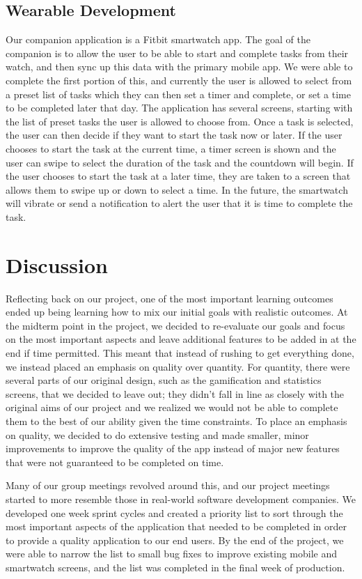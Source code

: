 \documentclass{sigchi}
\begin{document}
\subsection{Wearable Development}
Our companion application is a Fitbit smartwatch app. The goal of the companion
is to allow the user to be able to start and complete tasks from their watch,
and then sync up this data with the primary mobile app. We were able to complete
the first portion of this, and currently the user is allowed to select from a
preset list of tasks which they can then set a timer and complete, or set a
time to be completed later that day. The application has several screens,
starting with the list of preset tasks the user is allowed to choose from. Once
a task is selected, the user can then decide if they want to start the task
now or later. If the user chooses to start the task at the current time, a
timer screen is shown and the user can swipe to select the duration of the task
and the countdown will begin. If the user chooses to start the task at a later
time, they are taken to a screen that allows them to swipe up or down to select
a time. In the future, the smartwatch will vibrate or send a notification to
alert the user that it is time to complete the task.


\section{Discussion}

Reflecting back on our project, one of the most important learning outcomes
ended up being learning how to mix our initial goals with realistic outcomes.
At the midterm point in the project, we decided to re-evaluate our goals and
focus on the most important aspects and leave additional features to be added
in at the end if time permitted. This meant that instead of rushing to get
everything done, we instead placed an emphasis on quality over quantity. For
quantity, there were several parts of our original design, such as the
gamification and statistics screens, that we decided to leave out; they
didn’t fall in line as closely with the original aims of our project and we
realized we would not be able to complete them to the best of our ability
given the time constraints. To place an emphasis on quality, we decided to do
extensive testing and made smaller, minor improvements to improve the quality
of the app instead of major new features that were not guaranteed to be
completed on time.

Many of our group meetings revolved around this, and our project meetings
started to more resemble those in real-world software development companies. We
developed one week sprint cycles and created a priority list to sort through
the most important aspects of the application that needed to be completed in
order to provide a quality application to our end users. By the end of the
project, we were able to narrow the list to small bug fixes to improve existing
mobile and smartwatch screens, and the list was completed in the final week of
production. 
\end{document}
